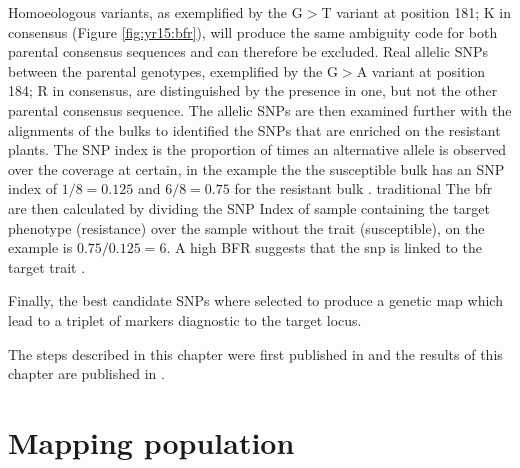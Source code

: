Homoeologous variants, as exemplified by the G$>$T variant at position 181; K in consensus (Figure \ref{fig:yr15:bfr}), will produce the same ambiguity code for both parental consensus sequences and can therefore be excluded. 
Real allelic SNPs between the parental genotypes, exemplified by the G$>$A variant at position 184; R in consensus, are distinguished by the presence in one, but not the other parental consensus sequence. 
The allelic SNPs are then examined further with the alignments of the bulks to identified the SNPs that are enriched on the resistant plants.
The SNP index is the proportion of times an alternative allele is observed over the coverage at certain, in the example the the susceptible bulk has an SNP index of $1/8=0.125$ and $6/8=0.75$ for the resistant bulk \citep{Takagi2013a}. traditional
The \acrshort{bfr} are then calculated by dividing the SNP Index of sample containing the target phenotype (resistance) over the sample without the trait (susceptible), on the example is $0.75/0.125=6$.  
A high BFR suggests that the \acrshort{snp} is linked to the target trait \citep{Trick2012}. 


Finally, the best candidate SNPs where selected to produce a genetic map which lead to a triplet of markers diagnostic to the target locus. 

The steps described in this chapter were first published in \citet{Ramirez-Gonzalez2015c} and the results of this chapter are published in \citet{Ramirez-Gonzalez2015b}.

\section{Mapping population}


